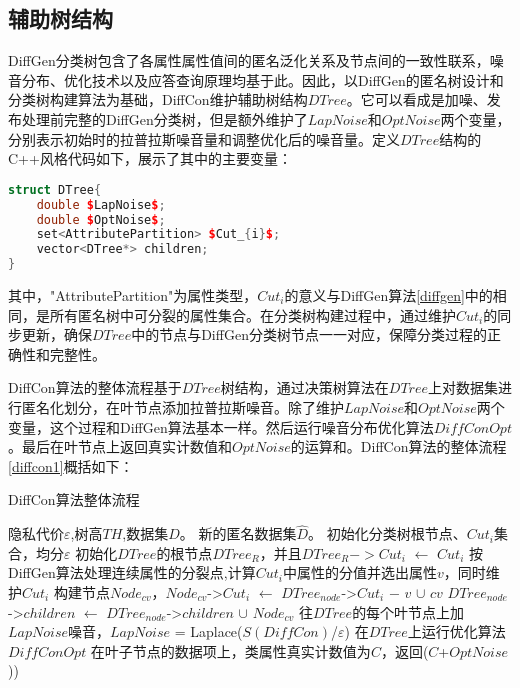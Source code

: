\subsection{辅助树结构}

DiffGen分类树包含了各属性属性值间的匿名泛化关系及节点间的一致性联系，噪音分布、优化技术以及应答查询原理均基于此。因此，以DiffGen的匿名树设计和分类树构建算法为基础，DiffCon维护辅助树结构$DTree$。它可以看成是加噪、发布处理前完整的DiffGen分类树，但是额外维护了$LapNoise$和$OptNoise$两个变量，分别表示初始时的拉普拉斯噪音量和调整优化后的噪音量。定义$DTree$结构的C++风格代码如下，展示了其中的主要变量：

\begin{lstlisting}[language={C++}, caption={DTree结构伪代码}]
struct DTree{
	double $LapNoise$;
	double $OptNoise$;
	set<AttributePartition> $Cut_{i}$;
	vector<DTree*> children;
}
\end{lstlisting}
其中，"AttributePartition"为属性类型，$Cut_{i}$的意义与DiffGen算法\ref{diffgen}中的相同，是所有匿名树中可分裂的属性集合。在分类树构建过程中，通过维护$Cut_{i}$的同步更新，确保$DTree$中的节点与DiffGen分类树节点一一对应，保障分类过程的正确性和完整性。

DiffCon算法的整体流程基于$DTree$树结构，通过决策树算法在$DTree$上对数据集进行匿名化划分，在叶节点添加拉普拉斯噪音。除了维护$LapNoise$和$OptNoise$两个变量，这个过程和DiffGen算法基本一样。然后运行噪音分布优化算法$DiffConOpt$。最后在叶节点上返回真实计数值和$OptNoise$的运算和。DiffCon算法的整体流程\ref{diffcon1}概括如下：

\begin{algorithm}
	\caption{DiffCon算法整体流程} 
	\label{diffcon1}
	\begin{algorithmic}[1]
		\REQUIRE 隐私代价$\varepsilon$,树高$TH$,数据集$D$。
		\ENSURE 新的匿名数据集$\hat{D}$。
		\STATE 初始化分类树根节点、$Cut_{i}$集合，均分$\varepsilon$
		\STATE 初始化$DTree$的根节点$DTree_{R}$，并且$DTree_{R}->Cut_{i}$ $\leftarrow$ $Cut_{i}$
		\STATE 按DiffGen算法处理连续属性的分裂点,计算$Cut_{i}$中属性的分值并选出属性$v$，同时维护$Cut_{i}$
		\STATE 构建节点$Node_{cv}$，$Node_{cv}$->$Cut_{i}$ $\leftarrow$ $DTree_{node}$->$Cut_{i}$ $ - $ $v$ $\cup$ $cv$
		\STATE $DTree_{node}$->$children$ $\leftarrow$ $DTree_{node}$->$children$ $\cup$ $Node_{cv}$
		\ENDFOR
		\ENDIF 
		\ENDFOR
		\ENDFOR
		\STATE 往$DTree$的每个叶节点上加$LapNoise$噪音，$LapNoise$ = Laplace($S(DiffCon)$/$\varepsilon$)
		\STATE 在$DTree$上运行优化算法$DiffConOpt$
		\RETURN 在叶子节点的数据项上，类属性真实计数值为$C$，返回($C$+$OptNoise$))
	\end{algorithmic}
\end{algorithm} 

